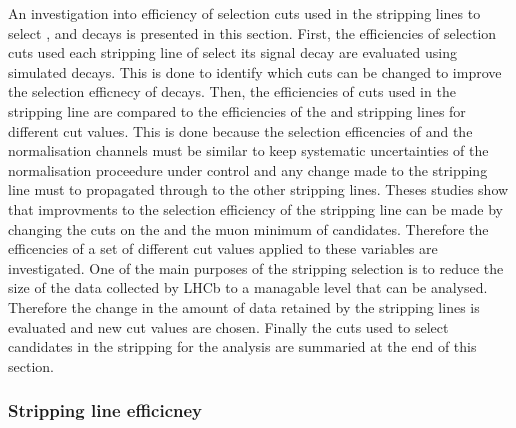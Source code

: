 An investigation into efficiency of selection cuts used in the stripping lines to select \bmumu, \bhh and \bujpsik decays is presented in this section. %
First, the efficiencies of selection cuts used each stripping line of select its signal decay are evaluated using simulated decays. This is done to identify which cuts can be changed to improve the selection efficnecy of \bmumu decays.
Then, the efficiencies of cuts used in the \bmumu stripping line are compared to the efficiencies of the \bhh and \bujpsik stripping lines for different cut values. %
This is done because the selection efficencies of \bmumu and the normalisation channels must be similar to keep systematic uncertainties of the normalisation proceedure under control and any change made to the \bmumu stripping line must to propagated through to the other stripping lines. 
Theses studies show that improvments to the selection efficiency of the \bmumu stripping line can be made by changing the cuts on the \bsd \chiFD and the muon minimum \chiIP of \bmumu candidates. Therefore the efficencies of a set of different cut values applied to these variables are investigated. %
One of the main purposes of the stripping selection is to reduce the size of the data collected by LHCb to a managable level that can be analysed. Therefore the change in the amount of data retained by the stripping lines is evaluated and new cut values are chosen. Finally the cuts used to select candidates in the stripping for the \BF analysis are summaried at the end of this section.


\subsubsection*{Stripping line efficicney}



